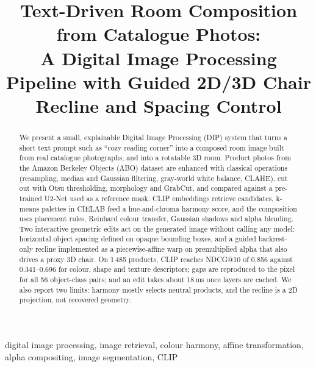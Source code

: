 \documentclass[conference]{IEEEtran}
\begin{document}
\title{Text-Driven Room Composition from Catalogue Photos:\\
A Digital Image Processing Pipeline with Guided 2D/3D Chair Recline and Spacing Control}

\author{
\and
{}
}

\maketitle

\begin{abstract}
We present a small, explainable Digital Image Processing (DIP) system that turns a short text prompt such as ``cozy reading corner'' into a composed room image built from real catalogue photographs, and into a rotatable 3D room. Product photos from the Amazon Berkeley Objects (ABO) dataset are enhanced with classical operations (resampling, median and Gaussian filtering, gray-world white balance, CLAHE), cut out with Otsu thresholding, morphology and GrabCut, and compared against a pre-trained U2-Net used as a reference mask. CLIP embeddings retrieve candidates, k-means palettes in CIELAB feed a hue-and-chroma harmony score, and the composition uses placement rules, Reinhard colour transfer, Gaussian shadows and alpha blending. Two interactive geometric edits act on the generated image without calling any model: horizontal object spacing defined on opaque bounding boxes, and a guided backrest-only recline implemented as a piecewise-affine warp on premultiplied alpha that also drives a proxy 3D chair. On 1\,485 products, CLIP reaches NDCG@10 of 0.856 against 0.341--0.696 for colour, shape and texture descriptors; gaps are reproduced to the pixel for all 56 object-class pairs; and an edit takes about 18\,ms once layers are cached. We also report two limits: harmony mostly selects neutral products, and the recline is a 2D projection, not recovered geometry.
\end{abstract}

\begin{IEEEkeywords}
digital image processing, image retrieval, colour harmony, affine transformation, alpha compositing, image segmentation, CLIP
\end{IEEEkeywords}
\end{document}
